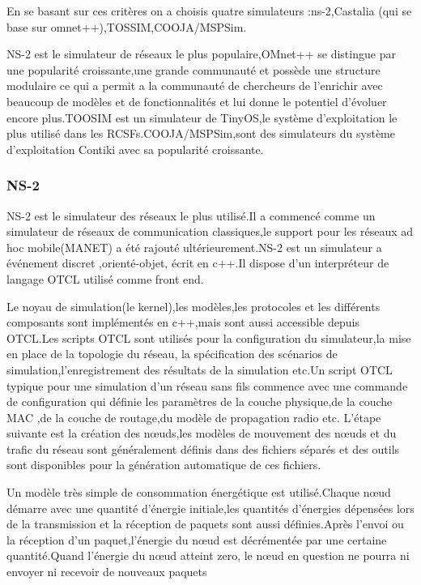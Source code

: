 En se basant sur ces critères on a choisis quatre simulateurs :ns-2,Castalia (qui se base sur omnet++),TOSSIM,COOJA/MSPSim.

NS-2 est le simulateur de réseaux le plus populaire,OMnet++ se distingue par une popularité croissante,une grande communauté et possède une structure modulaire ce qui a permit a la communauté de chercheurs de l'enrichir avec beaucoup de modèles et de fonctionnalités et lui donne le potentiel d'évoluer encore plus.TOOSIM est un simulateur de TinyOS,le système d'exploitation le plus utilisé dans les RCSFs.COOJA/MSPSim,sont des simulateurs du système d'exploitation Contiki avec sa popularité croissante. 

  
 \subsubsection{NS-2}
NS-2 est le simulateur des réseaux le plus utilisé.Il a commencé comme un simulateur de réseaux de communication classiques,le support pour les réseaux ad hoc mobile(MANET) a été rajouté ultérieurement.NS-2 est un simulateur a événement discret ,orienté-objet, écrit en c++.Il dispose d'un interpréteur de langage OTCL utilisé comme front end.

Le noyau de simulation(le kernel),les modèles,les protocoles et les différents composants sont implémentés en c++,mais sont aussi accessible depuis OTCL.Les scripts OTCL sont utilisés pour la configuration du simulateur,la mise en place de la topologie du réseau, la spécification des scénarios de simulation,l'enregistrement des résultats de la simulation etc.Un script OTCL typique pour une simulation d'un réseau sans fils commence avec une commande de configuration qui définie les paramètres de la couche physique,de la couche MAC ,de  la couche de routage,du modèle de propagation radio etc.
L'étape suivante est la création des nœuds,les modèles de mouvement des nœuds et du trafic du réseau sont généralement définis dans des fichiers séparés et des outils sont disponibles pour la génération automatique de ces fichiers.

Un modèle très simple de consommation énergétique est utilisé.Chaque nœud démarre avec une quantité d'énergie initiale,les quantités d'énergies dépensées lors de la transmission et la réception de paquets sont aussi définies.Après l'envoi ou la réception d'un paquet,l'énergie du nœud est décrémentée par une certaine quantité.Quand l'énergie du nœud atteint zero, le nœud en question ne pourra ni envoyer ni recevoir de nouveaux paquets  

